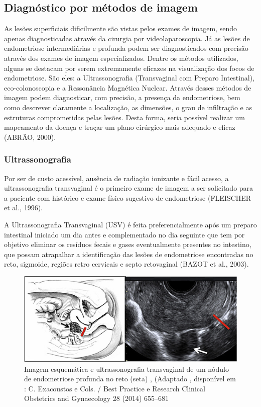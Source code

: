 \documentclass[12pt]{article} %
\begin{document}
\subsection{Diagnóstico por métodos de imagem}

As lesões superficiais dificilmente são vistas pelos exames de imagem, sendo apenas diagnosticadas através da cirurgia por videolaparoscopia. Já as lesões de endometriose intermediárias e profunda podem ser diagnosticados com precisão através dos exames de imagem especializados. Dentre os métodos utilizados, alguns se destacam por serem extremamente eficazes na visualização dos focos de endometriose. São eles: a Ultrassonografia (Transvaginal com Preparo Intestinal), eco-colonoscopia e a Ressonância Magnética Nuclear. Através desses métodos de imagem podem diagnosticar, com precisão, a presença da endometriose, bem como descrever claramente a localização, as dimensões, o grau de infiltração e as estruturas comprometidas pelas lesões. Desta forma, seria possível realizar um mapeamento da doença e traçar um plano cirúrgico mais adequado e eficaz (ABRÃO, 2000).

\subsubsection{Ultrassonografia } 

Por ser de custo acessível, ausência de radiação ionizante e fácil acesso, a ultrassonografia transvaginal é o primeiro exame de imagem a ser solicitado para a paciente com histórico e exame físico sugestivo de endometriose (FLEISCHER et al., 1996).

A Ultrassonografia Transvaginal (USV) é feita  preferencialmente após um preparo intestinal iniciado um dia antes e complementado no dia seguinte que tem por objetivo eliminar os resíduos fecais e gases eventualmente presentes no intestino, que possam atrapalhar a identificação das lesões de endometriose encontradas no reto, sigmoide, regiões retro cervicais e septo retovaginal (BAZOT et al., 2003).

\begin{figure}[h!]
\centering
\includegraphics[width=16cm]{USV.png}
\caption[Imagem esquemática e ultrassonografia transvaginal de um nódulo de endometriose profunda no reto]{Imagem esquemática e ultrassonografia transvaginal de um nódulo de endometriose profunda no reto (seta) , (Adaptado , disponível em : C. Exacoustos e Cols. / Best Practice e Research Clinical Obstetrics and Gynaecology 28 (2014) 655–681 }
\end{figure}
\end{document}
